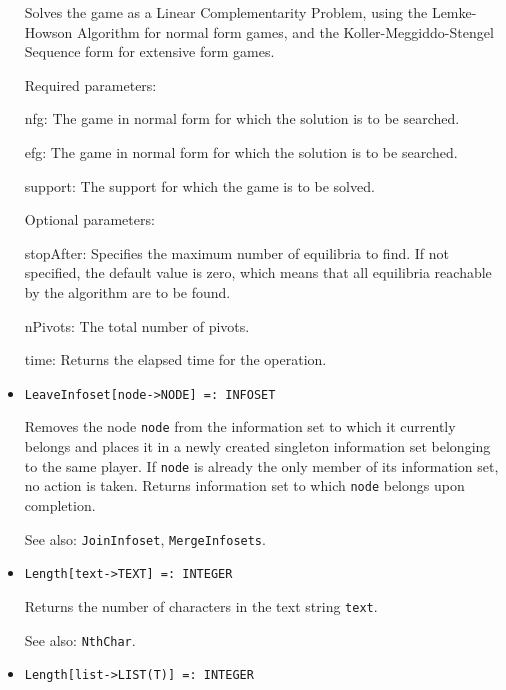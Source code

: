 \begin{itemize}
\bd
Solves the game as a Linear Complementarity Problem, using the
Lemke-Howson Algorithm for normal form games, and the
Koller-Meggiddo-Stengel Sequence form for extensive form games.  

\item
[Required parameters:]\hfil\null

\bd
\item
[nfg:] The game in normal form for which the solution is to be
searched.
\item
[efg:] The game in normal form for which the solution is to be
searched.
\item
[support:] The support for which the game is to be solved. 
\ed

\item
[Optional parameters:]\hfil\null

\bd
\item
[stopAfter:] Specifies the maximum number of equilibria to find.  If
not specified, the default value is zero, which means that all
equilibria reachable by the algorithm are to be found.
\item
[nPivots:] The total number of pivots. 
\item
[time:] Returns the elapsed time for the operation.
\ed
\ed

\item
\protect \large \begin{verbatim}
LeaveInfoset[node->NODE] =: INFOSET
\end{verbatim}\normalsize

\bd
Removes the node \verb+node+ from the information set to
which it currently belongs and places it in a newly created
singleton information set belonging to the same player.  If \verb+node+
is already the only member of its information set, no action is taken.
Returns information set to which \verb+node+ belongs upon completion.
\item
[See also:] {\tt JoinInfoset}, {\tt MergeInfosets}.
\ed

\item
\protect \large \begin{verbatim}
Length[text->TEXT] =: INTEGER
\end{verbatim}\normalsize

\bd
Returns the number of characters in the text string
\verb+text+.
\item
[See also:] {\tt NthChar}.
\ed

\item
\protect \large \begin{verbatim}
Length[list->LIST(T)] =: INTEGER
\end{verbatim}\normalsize


\end{itemize}
